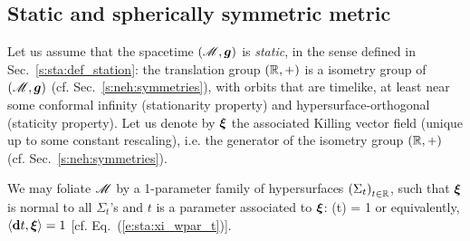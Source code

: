 \subsection{Static and spherically symmetric metric} \label{s:sch:static_spher}

Let us assume that the spacetime $(\mathscr{M},\bm{g})$ is \emph{static}, in the sense defined in Sec.~\ref{s:sta:def_station}:
the translation group $(\mathbb{R},+)$ is a isometry group of $(\mathscr{M},\bm{g})$
(cf. Sec.~\ref{s:neh:symmetries}), with orbits that are timelike, at least near
some conformal infinity (stationarity property) and hypersurface-orthogonal (staticity property). Let us denote by $\bm{\xi}$ the associated Killing vector
field (unique up to some constant rescaling), i.e. the generator of the
isometry group $(\mathbb{R},+)$ (cf. Sec.~\ref{s:neh:symmetries}).

We may foliate $\mathscr{M}$ by a 1-parameter family of hypersurfaces
$\left(\Sigma_t\right)_{t\in\mathbb{R}}$, such that $\bm{\xi}$ is normal to
all $\Sigma_t$'s and $t$ is a parameter associated to $\bm{\xi}$:
\be \label{e:sch:xi_t}
    \w{\xi}(t) = 1
\ee
or equivalently, $\langle \mathbf{d} t , \bm{\xi} \rangle = 1$ [cf. Eq.~(\ref{e:sta:xi_wpar_t})].

